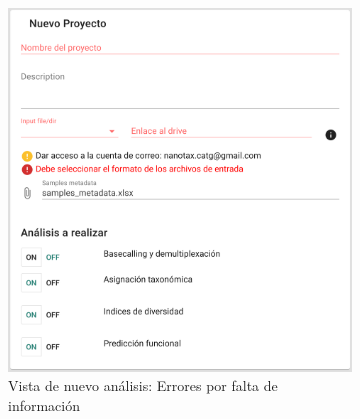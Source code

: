 \begin{itemize}
\begin{figure}[H]
    \centering
    \begin{subfigure}[b]{0.45\textwidth}
        \centering
        \includegraphics[width=\textwidth]{images/app/newAnalysis/errors1.png}
        \caption{Vista de nuevo análisis: Errores por falta de información}
        \label{fig:app-new-analysis-nodata-error}
    \end{subfigure}
    \hfill
    \begin{subfigure}[b]{0.45\textwidth}
        \centering

\end{subfigure}
\end{figure}
\end{itemize}
